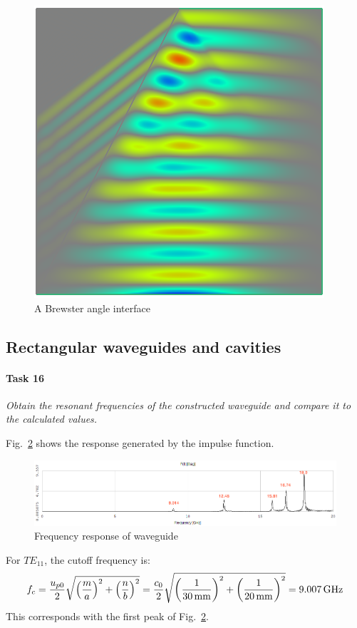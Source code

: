 \begin{figure}[tbph]
	\centering
	\includegraphics[width=0.6\linewidth]{graphics/Task9-Brewster}
	\caption{A Brewster angle interface}
	\label{fig:Task9-Brewster}
\end{figure}


\subsection{Rectangular waveguides and cavities}
\paragraph{Task 16}\textit{Obtain the resonant frequencies of the constructed waveguide and compare it to the calculated values.}

Fig.~\ref{fig:Task16-Analyzer} shows the response generated by the impulse function.
\begin{figure}[tbph]
	\centering
	\includegraphics[width=0.95\linewidth]{graphics/Task16-Analyzer-annotated}
	\caption{Frequency response of waveguide}
	\label{fig:Task16-Analyzer}
\end{figure}

For $TE_{11}$, the cutoff frequency is:
\begin{align*}
	f_c = {u_{p0} \over 2} \sqrt{\left({m \over a}\right)^2 + \left({n \over b}\right)^2} = {c_0 \over 2} \sqrt{\left({1 \over \SI{30}{\milli\meter}}\right)^2 + \left({1 \over \SI{20}{\milli\meter}}\right)^2} = \SI{9.007}{\giga\hertz}
\end{align*}
This corresponds with the first peak of Fig.~\ref{fig:Task16-Analyzer}.


